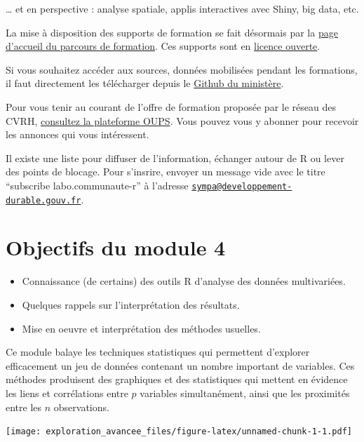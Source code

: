 \documentclass[]{book}
\providecommand{\tightlist}{%
  \setlength{\itemsep}{0pt}\setlength{\parskip}{0pt}}
\begin{document}
\ldots{} et en perspective : analyse spatiale, applis interactives avec Shiny, big data, etc.

La mise à disposition des supports de formation se fait désormais par la \href{https://mtes-mct.github.io/parcours-r/}{page d'accueil du parcours de formation}. Ces supports sont en \href{https://www.etalab.gouv.fr/wp-content/uploads/2017/04/ETALAB-Licence-Ouverte-v2.0.pdf}{licence ouverte}.

Si vous souhaitez accéder aux sources, données mobilisées pendant les formations, il faut directement les télécharger depuis le \href{https://github.com/MTES-MCT/parcours-r/tree/master/Supports_formations}{Github du ministère}.

Pour vous tenir au courant de l'offre de formation proposée par le réseau des CVRH, \href{http://oups-cmvrh.e2.rie.gouv.fr/}{consultez la plateforme OUPS}. Vous pouvez vous y abonner pour recevoir les annonces qui vous intéressent.

Il existe une liste pour diffuser de l'information, échanger autour de R ou lever des points de blocage. Pour s'insrire, envoyer un message vide avec le titre ``subscribe labo.communaute-r'' à l'adresse \href{mailto:sympa@developpement-durable.gouv.fr}{\nolinkurl{sympa@developpement-durable.gouv.fr}}.

\hypertarget{objectifs-du-module-4}{%
\section{Objectifs du module 4}\label{objectifs-du-module-4}}

\begin{itemize}
\tightlist
\item
  Connaissance (de certains) des outils R d'analyse des données multivariées.
\item
  Quelques rappels sur l'interprétation des résultats.
\item
  Mise en oeuvre et interprétation des méthodes usuelles.
\end{itemize}

Ce module balaye les techniques statistiques qui permettent d'explorer efficacement un jeu de données contenant un nombre important de variables. Ces méthodes produisent des graphiques et des statistiques qui mettent en évidence les liens et corrélations entre \(p\) variables simultanément, ainsi que les proximités entre les \(n\) observations.

\texttt{[image: exploration\_avancee\_files/figure-latex/unnamed-chunk-1-1.pdf]}
\end{document}
